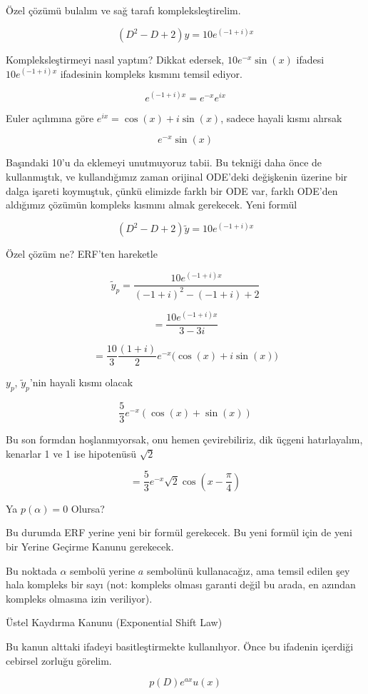 \documentclass[12pt,fleqn]{article}\usepackage{../../common}
\begin{document}
Özel çözümü bulalım ve sağ tarafı kompleksleştirelim. 

$$ (D^2 - D + 2)y = 10 e ^{(-1 + i)x} $$

Kompleksleştirmeyi nasıl yaptım? Dikkat edersek, $10e^{-x}\sin(x)$ ifadesi
$10 e^{(-1 + i)x}$ ifadesinin kompleks kısmını temsil ediyor. 

$$ e ^{(-1 + i)x} = e^{-x} e^{ix} $$

Euler açılımına göre $e^{ix} = \cos(x) + i\sin(x)$, sadece hayali kısmı alırsak

$$ e^{-x} \sin(x)  $$

Başındaki 10'u da eklemeyi unutmuyoruz tabii. Bu tekniği daha önce de
kullanmıştık, ve kullandığımız zaman orijinal ODE'deki değişkenin üzerine
bir dalga işareti koymuştuk, çünkü elimizde farklı bir ODE var, farklı
ODE'den aldığımız çözümün kompleks kısmını almak gerekecek. Yeni formül

$$ (D^2 - D + 2)\tilde{y} = 10 e ^{(-1 + i)x} $$

Özel çözüm ne? ERF'ten hareketle

$$ \tilde{y}_p = \frac{10 e^{(-1+i)x}}{(-1+i)^2 - (-1+i) + 2} $$

$$  = \frac{10 e^{(-1+i)x}}{3 - 3i} $$

$$ = \frac{10}{3}\frac{(1+i)}{2} e^{-x} \bigg( \cos(x) + i\sin(x) \bigg)$$

$y_p$, $\tilde{y}_p$'nin hayali kısmı olacak

$$ \frac{5}{3}e^{-x}( \cos(x) + \sin(x)) $$

Bu son formdan hoşlanmıyorsak, onu hemen çevirebiliriz, dik üçgeni
hatırlayalım, kenarlar 1 ve 1 ise hipotenüsü $\sqrt{2}$

$$ = \frac{5}{3}e^{-x} \sqrt{2}\cos(x - \frac{\pi}{4})$$

Ya $p(\alpha) = 0$ Olursa?

Bu durumda ERF yerine yeni bir formül gerekecek. Bu yeni formül için de
yeni bir Yerine Geçirme Kanunu gerekecek. 

Bu noktada $\alpha$ sembolü yerine $a$ sembolünü kullanacağız, ama temsil
edilen şey hala kompleks bir sayı (not: kompleks olması garanti değil bu
arada, en azından kompleks olmasına izin veriliyor). 

Üstel Kaydırma Kanunu (Exponential Shift Law)

Bu kanun alttaki ifadeyi basitleştirmekte kullanılıyor. Önce bu ifadenin
içerdiği cebirsel zorluğu görelim.

$$ p(D)e^{ax}u(x) $$
\end{document}
